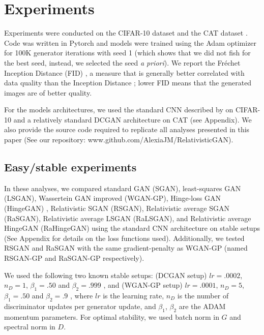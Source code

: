 \documentclass{article}
\begin{document}
\section{Experiments}

Experiments were conducted on the CIFAR-10 dataset \citep{krizhevsky2009learning} and the CAT dataset \citep{cat}. Code was written in Pytorch \citep{pytorch} and models were trained using the Adam optimizer \citep{Adam} for 100K generator iterations with seed 1 (which shows that we did not fish for the best seed, instead, we selected the seed \textit{a priori}). We report the Fréchet Inception Distance (FID) \citep{heusel2017gans}, a measure that is generally better correlated with data quality than the Inception Distance \citep{tricks} \citep{borji2018pros}; lower FID means that the generated images are of better quality. 

For the models architectures, we used the standard CNN described by \citet{miyato2018spectral} on CIFAR-10 and a relatively standard DCGAN architecture \citep{DCGAN} on CAT (see Appendix). We also provide the source code required to replicate all analyses presented in this paper (See our repository: www.github.com/AlexiaJM/RelativisticGAN).

\subsection{Easy/stable experiments}

In these analyses, we compared standard GAN (SGAN), least-squares GAN (LSGAN), Wassertein GAN improved (WGAN-GP), Hinge-loss GAN (HingeGAN) \citep{miyato2018spectral}, Relativistic SGAN (RSGAN), Relativistic average SGAN (RaSGAN), Relativistic average LSGAN (RaLSGAN), and Relativistic average HingeGAN (RaHingeGAN) using the standard CNN architecture on stable setups (See Appendix for details on the loss functions used). Additionally, we tested RSGAN and RaSGAN with the same gradient-penalty as WGAN-GP (named RSGAN-GP and RaSGAN-GP respectively). 

We used the following two known stable setups: (DCGAN setup) $lr=.0002$, $n_D=1$, $\beta_1=.50$ and $\beta_2=.999$ \citep{DCGAN}, and (WGAN-GP setup) $lr=.0001$, $n_D=5$, $\beta_1=.50$ and $\beta_2=.9$ \citep{WGAN-GP}, where $lr$ is the learning rate, $n_D$ is the number of discriminator updates per generator update, and $\beta_1$, $\beta_2$ are the ADAM momentum parameters. For optimal stability, we used batch norm \citep{BatchNorm} in $G$ and spectral norm \citep{miyato2018spectral} in $D$.
\end{document}
